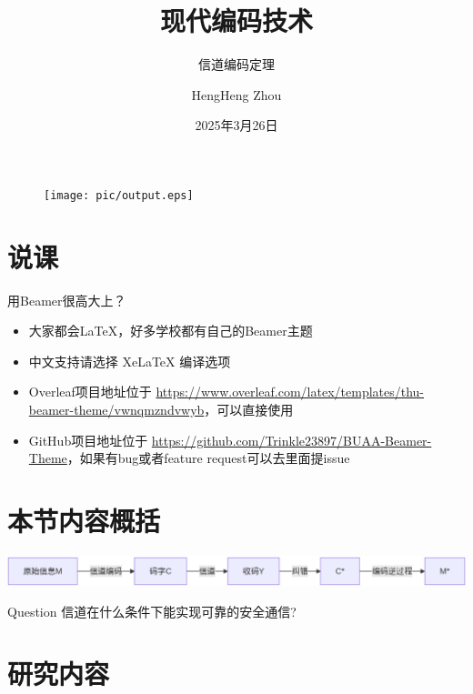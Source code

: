 \documentclass{beamer}
\author{HengHeng Zhou}
\title{现代编码技术}
\subtitle{信道编码定理}
\institute{电信与智能制造学院}
\date{2025年3月26日}
\begin{document}
\kaishu
\begin{frame}
	\titlepage
	\begin{figure}[htpb]
		\begin{center}
			\texttt{[image: pic/output.eps]}
		\end{center}
	\end{figure}
\end{frame}

\begin{frame}
	\tableofcontents[sectionstyle=show,subsectionstyle=show/shaded/hide,subsubsectionstyle=show/shaded/hide]
\end{frame}


\section{说课}

\begin{frame}{用Beamer很高大上？}
	\begin{itemize}[<+-| alert@+>] %
		\item 大家都会\LaTeX{}，好多学校都有自己的Beamer主题
		\item 中文支持请选择 Xe\LaTeX{} 编译选项
		\item Overleaf项目地址位于 \url{https://www.overleaf.com/latex/templates/thu-beamer-theme/vwnqmzndvwyb}，可以直接使用
		\item GitHub项目地址位于 \url{https://github.com/Trinkle23897/BUAA-Beamer-Theme}，如果有bug或者feature request可以去里面提issue
	\end{itemize}
\end{frame}


\section{本节内容概括}

\begin{frame}
	\includegraphics[width=0.9\linewidth]{pic/modle.eps}
	\pause 
	\begin{block}{Question}
		信道在什么条件下能实现可靠的安全通信?
	\end{block}
\end{frame}


\section{研究内容}
\end{document}
